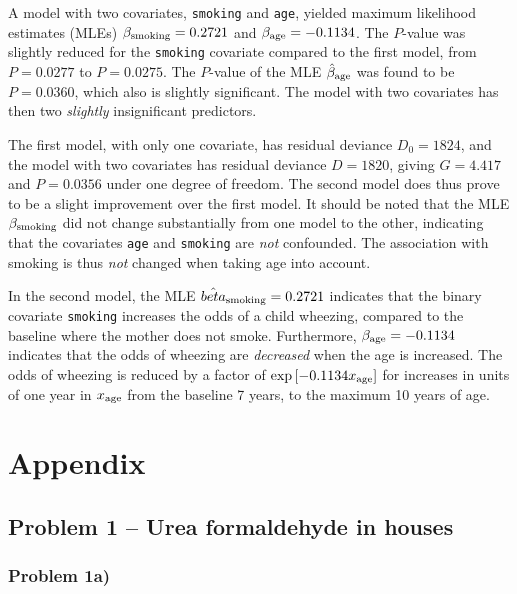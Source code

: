 \documentclass[a4paper,11pt]{article}
\begin{document}
\begin{enumerate}[label=3\alph*)]
        A model with two covariates, \texttt{smoking} and \texttt{age}, yielded maximum likelihood estimates (MLEs) $\beta_{\rm smoking} = 0.2721$ and $\beta_{\rm age} = -0.1134$. The $P$-value was slightly reduced for the \texttt{smoking} covariate compared to the first model, from $P = 0.0277$ to $P= 0.0275$. The $P$-value of the MLE $\hat{\beta}_{\rm age}$ was found to be $P = 0.0360$, which also is slightly significant. The model with two covariates has then two \textit{slightly} insignificant predictors.

        The first model, with only one covariate, has residual deviance $D_0 = 1824$, and the model with two covariates has residual deviance $D = 1820$, giving $G = 4.417$ and $P = 0.0356$ under one degree of freedom. The second model does thus prove to be a slight improvement over the first model. It should be noted that the MLE $\beta_{\rm smoking}$ did not change substantially from one model to the other, indicating that the covariates \texttt{age} and \texttt{smoking} are \textit{not} confounded. The association with smoking is thus \textit{not} changed when taking age into account.

        In the second model, the MLE $\hat{beta}_{\rm smoking} = 0.2721$ indicates that the binary covariate \texttt{smoking} increases the odds of a child wheezing, compared to the baseline where the mother does not smoke. Furthermore, $\beta_{\rm age} = -0.1134$ indicates that the odds of wheezing are \textit{decreased} when the age is increased. The odds of wheezing is reduced by a factor of $\exp\left[ -0.1134 x_{\rm age} \right]$ for increases in units of one year in $x_{\rm age}$ from the baseline 7 years, to the maximum 10 years of age. 

\end{enumerate}



%
%

\clearpage
\appendix
\section{Appendix}
\label{sec:appendix}

\subsection{Problem 1 -- Urea formaldehyde in houses}
\label{app:1}
\subsubsection{Problem 1a)}
\label{app:1a}
\end{document}
